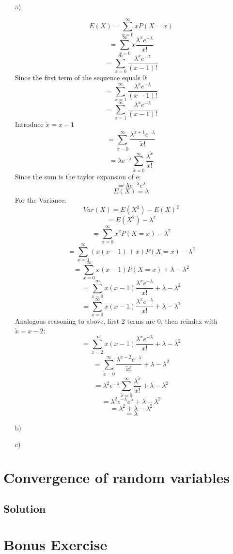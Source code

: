 \documentclass[10pt]{article}
\numberwithin{equation}{section}
\begin{document}
\begin{enumerate}
\item[a)]{
    $$E(X) = \sum_{x=0}^{\infty} x P(X=x)$$
    $$= \sum_{x=0}^{\infty} x \frac{\lambda^x e^{-\lambda}}{x!}$$
    $$= \sum_{x=0}^{\infty} \frac{\lambda^x e^{-\lambda}}{(x-1)!}$$
    Since the first term of the sequence equals 0:
    $$= \sum_{x=1}^{\infty} \frac{\lambda^x e^{-\lambda}}{(x-1)!}$$
    $$= \sum_{x=1}^{\infty} \frac{\lambda^x e^{-\lambda}}{(x-1)!}$$
    Introduce $\tilde{x} = x -1$
    $$= \sum_{\tilde{x}=0}^{\infty} \frac{\lambda^{\tilde{x}+1} e^{-\lambda}}{\tilde{x}!}$$
    $$= \lambda e^{-\lambda}\sum_{\tilde{x}=0}^{\infty} \frac{\lambda^{\tilde{x}}}{\tilde{x}!}$$
    Since the sum is the taylor expansion of e:
    $$= \lambda e^{-\lambda}e^{\lambda}$$
    $$E(X)=\lambda$$
    For the Variance:
    $$Var(X) = E(X^2) - E(X)^2$$
    $$= E(X^2) - \lambda^2$$
    $$= \sum_{x=0}^{\infty} x^2 P(X=x) - \lambda^2$$
    $$= \sum_{x=0}^{\infty} (x(x-1) + x) P(X=x) - \lambda^2$$
    $$= \sum_{x=0}^{\infty} x(x-1) P(X=x)  + \lambda - \lambda^2$$
    $$= \sum_{x=0}^{\infty} x(x-1) \frac{\lambda^x e^{-\lambda}}{x!}  + \lambda - \lambda^2$$
    $$= \sum_{x=0}^{\infty} x(x-1) \frac{\lambda^x e^{-\lambda}}{x!}  + \lambda - \lambda^2$$
    Analogous reasoning to above, first 2 terms are 0, then reindex with $\tilde{x} = x -2$:
    $$= \sum_{x=2}^{\infty} x(x-1) \frac{\lambda^x e^{-\lambda}}{x!}  + \lambda - \lambda^2$$
    $$= \sum_{\tilde{x}=0}^{\infty} \frac{\lambda^{\tilde{x} -2} e^{-\lambda}}{\tilde{x}!}  + \lambda - \lambda^2$$
    $$= \lambda^2 e^{-\lambda} \sum_{\tilde{x}=0}^{\infty} \frac{\lambda^{\tilde{x}}}{\tilde{x}!}  + \lambda - \lambda^2$$
    $$= \lambda^2 e^{-\lambda} e^{\lambda} + \lambda - \lambda^2$$
    $$= \lambda^2 + \lambda - \lambda^2$$
    $$= \lambda$$


}
\item[b)]{

}
\item[c)]{


}
\end{enumerate}

\section*{Convergence of random variables}
\subsection*{Solution}

\section*{Bonus Exercise}
\end{document}
